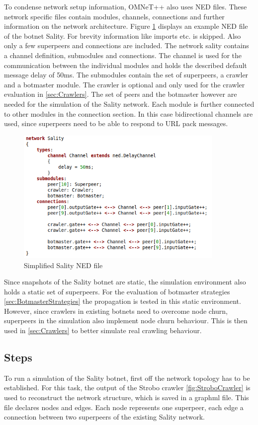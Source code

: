 \documentclass{article}
\begin{document}
To condense network setup information, OMNeT++ also uses NED files. These network specific files contain modules, channels, connections and further information on the network architecture.
Figure \ref{fig:SalityNED} displays an example NED file of the botnet Sality. For brevity information like imports etc. is skipped. Also only a few superpeers and connections are included. The network sality contains a channel definition, submodules and connections. The channel is used for the communication between the individual modules and holds the described default message delay of 50ms. The submodules contain the set of superpeers, a crawler and a botmaster module. The crawler is optional and only used for the crawler evaluation in \ref{sec:Crawlers}. The set of peers and the botmaster however are needed for the simulation of the Sality network. Each module is further connected to other modules in the connection section. In this case bidirectional channels are used, since superpeers need to be able to respond to URL pack messages. \\

\begin{figure}[H]
    \centering
    \includegraphics[width=10cm]{SalityNED.png}
    \caption{Simplified Sality NED file}
    \label{fig:SalityNED}
\end{figure}

Since snapshots of the Sality botnet are static, the simulation environment also holds a static set of superpeers. For the evaluation of botmaster strategies \ref{sec:BotmasterStrategies} the propagation is tested in this static environment. However, since crawlers in existing botnets need to overcome node churn, superpeers in the simulation also implement node churn behaviour. This is then used in \ref{sec:Crawlers} to better simulate real crawling behaviour. \\

\subsection{Steps}
To run a simulation of the Sality botnet, first off the network topology has to be established. For this task, the output of the Strobo crawler \ref{fig:StroboCrawler} is used to reconstruct the network structure, which is saved in a graphml file. This file declares nodes and edges. Each node represents one superpeer, each edge a connection between two superpeers of the existing Sality network. \\
\end{document}
